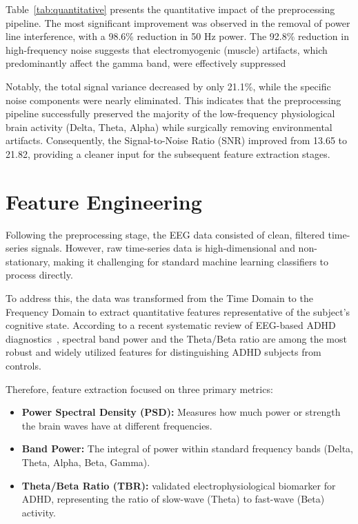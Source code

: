 \documentclass[11pt,a4paper]{article}
\begin{document}
Table~\ref{tab:quantitative} presents the quantitative impact of the preprocessing pipeline. The most significant improvement was observed in 
the removal of power line interference, with a 98.6\% reduction in 50 Hz power. The 92.8\% reduction in high-frequency noise suggests that 
electromyogenic (muscle) artifacts, which predominantly affect the gamma band, were effectively suppressed

Notably, the total signal variance decreased by only 21.1\%, while the specific noise components were nearly eliminated. This indicates that 
the preprocessing pipeline successfully preserved the majority of the low-frequency physiological brain activity (Delta, Theta, Alpha) while 
surgically removing environmental artifacts. Consequently, the Signal-to-Noise Ratio (SNR) improved from 13.65 to 21.82, providing a cleaner 
input for the subsequent feature extraction stages.


\section{Feature Engineering}\label{sec:features}
Following the preprocessing stage, the EEG data consisted of clean, filtered time-series signals. However, raw time-series data is 
high-dimensional and non-stationary, making it challenging for standard machine learning classifiers to process directly.

To address this, the data was transformed from the Time Domain to the Frequency Domain to extract quantitative features representative of the 
subject's cognitive state. According to a recent systematic review of EEG-based ADHD diagnostics~\cite{arpaia2022systematic}, spectral band 
power and the Theta/Beta ratio are among the most robust and widely utilized features for distinguishing ADHD subjects from controls.

Therefore, feature extraction focused on three primary metrics:

\begin{itemize}
    \item \textbf{Power Spectral Density (PSD):} Measures how much power or strength the brain waves have at different frequencies.
    \item \textbf{Band Power:} The integral of power within standard frequency bands (Delta, Theta, Alpha, Beta, Gamma).
    \item \textbf{Theta/Beta Ratio (TBR):}  validated electrophysiological biomarker for ADHD, representing the ratio of slow-wave (Theta) to 
        fast-wave (Beta) activity.
\end{itemize}
\end{document}
